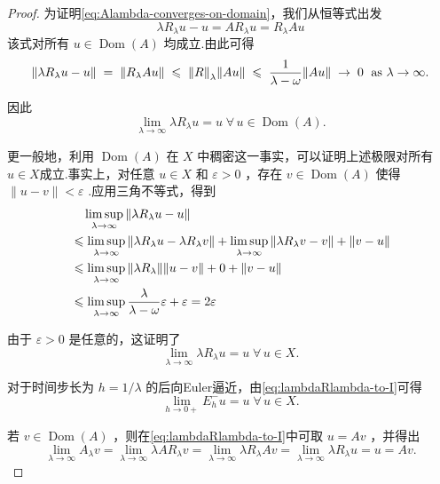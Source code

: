 \begin{proof}
为证明\eqref{eq:Alambda-converges-on-domain}，我们从恒等式出发
\[
\lambda {R}_{\lambda }u - u = A{R}_{\lambda }u = {R}_{\lambda }{Au}
\]
该式对所有 $u \in  \operatorname{Dom}\left( A\right)$ 均成立.由此可得
\[
\norm{\lambda {R}_{\lambda }u - u}\; = \;\norm{{R}_{\lambda }{Au}}\; \leqslant  \;\norm{R}_{\lambda }\norm{Au}\; \leqslant  \;\frac{1}{\lambda  - \omega }\| {Au}\| \; \rightarrow  \;0\;\text{ as }\lambda  \rightarrow  \infty .
\]

因此
\[
\mathop{\lim }\limits_{{\lambda  \rightarrow  \infty }}\lambda {R}_{\lambda }u = u\;\forall\,u \in  \operatorname{Dom}\left( A\right) .
\]

更一般地，利用 $\operatorname{Dom}\left( A\right)$ 在 $X$ 中稠密这一事实，可以证明上述极限对所有 $u \in  X$成立.事实上，对任意 $u \in  X$ 和 $\varepsilon  > 0$ ，存在 $v \in  \operatorname{Dom}\left( A\right)$ 使得 $\| u - v\|  < \varepsilon$ .应用三角不等式，得到
{\setjot[-2]\begin{align*}
    &\quad\limsup_{{\lambda  \rightarrow  \infty }}\norm{\lambda {R}_{\lambda }u - u} \\
    &\leqslant  \limsup_{{\lambda  \rightarrow  \infty }}\norm{\lambda {R}_{\lambda }u - \lambda {R}_{\lambda }v} + \limsup_{{\lambda  \rightarrow  \infty }}\norm{\lambda {R}_{\lambda }v - v} + \| v - u\| \\
    &\leqslant  \limsup_{{\lambda  \rightarrow  \infty }}\norm{\lambda {R}_{\lambda }}\| u - v\|  + 0 + \| v - u\|\\
    &\leqslant  \limsup_{{\lambda  \rightarrow  \infty }}\frac{\lambda }{\lambda  - \omega }\varepsilon  + \varepsilon  = {2\varepsilon }
\end{align*}}

由于 $\varepsilon  > 0$ 是任意的，这证明了
\begin{equation}\tag{7.33}\label{eq:lambdaRlambda-to-I}
\mathop{\lim }\limits_{{\lambda  \rightarrow  \infty }}\lambda {R}_{\lambda }u = u\;\forall\,u \in  X.
\end{equation}

对于时间步长为 $h = 1/\lambda$ 的后向Euler逼近，由\eqref{eq:lambdaRlambda-to-I}可得
\[
\mathop{\lim }\limits_{{h \rightarrow  0 + }}{E}_{h}^{ - }u = u\;\forall\,u \in  X.
\]

若 $v \in  \operatorname{Dom}\left( A\right)$ ，则在\eqref{eq:lambdaRlambda-to-I}中可取 $u = {Av}$ ，并得出
\[
\mathop{\lim }\limits_{{\lambda  \rightarrow  \infty }}{A}_{\lambda }v = \mathop{\lim }\limits_{{\lambda  \rightarrow  \infty }}{\lambda A}{R}_{\lambda }v = \mathop{\lim }\limits_{{\lambda  \rightarrow  \infty }}\lambda {R}_{\lambda }{Av} = \mathop{\lim }\limits_{{\lambda  \rightarrow  \infty }}\lambda {R}_{\lambda }u = u = {Av}.
\]


\end{proof}
